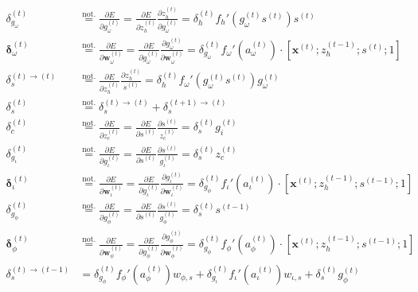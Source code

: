 \documentclass[11pt]{article}
\begin{document}
\begin{align}
    \delta_{g_{\omega}}^{(t)} &\overset{\text{not.}}{=} \displaystyle \frac{\partial E}{\partial g_{\omega}^{(t)}} = \displaystyle \frac{\partial E}{\partial z_{h}^{(t)}} \displaystyle \frac{\partial z_h^{(t)}}{\partial g_{\omega}^{(t)}} = \delta_h^{(t)}f_h'\left(g_{\omega}^{(t)}s^{(t)}\right)s^{(t)} \\
    \boldsymbol{\delta}_{\omega}^{(t)} &\overset{\text{not.}}{=} \displaystyle \frac{\partial E}{\partial \boldsymbol{w}_{\omega}^{(t)}} = \displaystyle \frac{\partial E}{\partial g_{\omega}^{(t)}} \displaystyle \frac{\partial g_{\omega}^{(t)}}{\partial \boldsymbol{w}_{\omega}^{(t)}} = \delta_{g_{\omega}}^{(t)} f_{\omega}'\left(a_{\omega}^{(t)}\right) \cdot \left[\mathbf{x}^{(t)}; z_{h}^{(t-1)}; s^{(t)}; 1\right] \\
    \delta_s^{(t)\rightarrow(t)} &\overset{\text{not.}}{=} \displaystyle \frac{\partial E}{\partial z_h^{(t)}}  \displaystyle \frac{\partial z_h^{(t)}}{s^{(t)}} = \delta_{h}^{(t)} f_{\omega}'\left(g_{\omega}^{(t)}s^{(t)}\right) g_{\omega}^{(t)} \\
    \delta_s^{(t)} &\overset{\text{not.}}{=} \delta^{(t) \rightarrow (t)}_s + \delta^{(t+1) \rightarrow (t)}_s \\
    \delta_c^{(t)} &\overset{\text{not.}}{=} \displaystyle \frac{\partial E}{\partial z_c^{(t)}} = \displaystyle \frac{\partial E}{\partial s^{(t)}}  \displaystyle \frac{\partial s^{(t)}}{z_c^{(t)}} = \delta_s^{(t)} g_i^{(t)} \\
    \delta_{g_{\iota}}^{(t)} &\overset{\text{not.}}{=} \displaystyle \frac{\partial E}{\partial g_{\iota}^{(t)}} = \displaystyle \frac{\partial E}{\partial s^{(t)}}  \displaystyle \frac{\partial s^{(t)}}{g_{\iota}^{(t)}} = \delta_s^{(t)} z_c^{(t)} \\
    \boldsymbol{\delta}_{\iota}^{(t)} &\overset{\text{not.}}{=} \displaystyle \frac{\partial E}{\partial \boldsymbol{w}_{\iota}^{(t)}} = \displaystyle \frac{\partial E}{\partial g_{\iota}^{(t)}} \displaystyle \frac{\partial g_{\iota}^{(t)}}{\partial \boldsymbol{w}_{\iota}^{(t)}} = \delta_{g_{\phi}}^{(t)} f_{\iota}'\left(a_{\iota}^{(t)}\right) \cdot \left[\mathbf{x}^{(t)}; z_{h}^{(t-1)}; s^{(t-1)}; 1\right] \\
    \delta_{g_{\phi}}^{(t)} &\overset{\text{not.}}{=} \displaystyle \frac{\partial E}{\partial g_{\phi}^{(t)}} = \displaystyle \frac{\partial E}{\partial s^{(t)}}  \displaystyle \frac{\partial s^{(t)}}{g_{\phi}^{(t)}} = \delta_s^{(t)} s^{(t-1)} \\
    \boldsymbol{\delta}_{\phi}^{(t)} &\overset{\text{not.}}{=} \displaystyle \frac{\partial E}{\partial \boldsymbol{w}_{\phi}^{(t)}} = \displaystyle \frac{\partial E}{\partial g_{\phi}^{(t)}} \displaystyle \frac{\partial g_{\phi}^{(t)}}{\partial \boldsymbol{w}_{\phi}^{(t)}} = \delta_{g_{\phi}}^{(t)} f_{\phi}'\left(a_{\phi}^{(t)}\right) \cdot \left[\mathbf{x}^{(t)}; z_{h}^{(t-1)}; s^{(t-1)}; 1\right] \\
    \delta^{(t) \rightarrow (t-1)}_s &= \delta_{g_{\phi}}^{(t)}f_{\phi}'\left(a_{\phi}^{(t)}\right)w_{\phi, s} +
        \delta_{g_{\iota}}^{(t)}f_{\iota}'\left(a_{\iota}^{(t)}\right)w_{\iota, s} +
        \delta_{s}^{(t)}g_{\phi}^{(t)}
\end{align}
\end{document}
